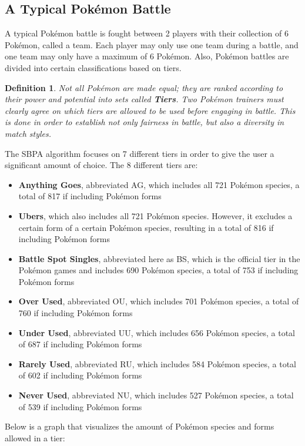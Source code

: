 \documentclass{article}
\newtheorem{definition}{Definition}
\begin{document}
\subsection{A Typical Pok\'emon Battle}
A typical Pok\'emon battle is fought between 2 players with their collection of 6 Pok\'emon, called a team. Each player may only use one team during a battle, and one team may only have a maximum of 6 Pok\'emon. Also, Pok\'emon battles are divided into certain classifications based on tiers.
\begin{definition}\label{tierdef}
	Not all Pok\'emon are made equal; they are ranked according to their power and potential into sets called \textbf{Tiers}. Two Pok\'emon trainers must clearly agree on which tiers are allowed to be used before engaging in battle. This is done in order to establish not only fairness in battle, but also a diversity in match styles.
\end{definition} 
The SBPA algorithm focuses on 7 different tiers in order to give the user a significant amount of choice. The 8 different tiers are:
\begin{itemize}
	\item \textbf{Anything Goes}, abbreviated AG, which includes all 721 Pok\'emon species, a total of 817 if including Pok\'emon forms
	\item \textbf{Ubers}, which also includes all 721 Pok\'emon species. However, it excludes a certain form of a certain Pok\'emon species, resulting in a total of 816 if including Pok\'emon forms
	\item \textbf{Battle Spot Singles}, abbreviated here as BS, which is the official tier in the Pok\'emon games and includes 690 Pok\'emon species, a total of 753 if including Pok\'emon forms
	\item \textbf{Over Used}, abbreviated OU, which includes 701 Pok\'emon species, a total of 760 if including Pok\'emon forms
	\item \textbf{Under Used}, abbreviated UU, which includes 656 Pok\'emon species, a total of 687 if including Pok\'emon forms
	\item \textbf{Rarely Used}, abbreviated RU, which includes 584 Pok\'emon species, a total of 602 if including Pok\'emon forms
	\item \textbf{Never Used}, abbreviated NU, which includes 527 Pok\'emon species, a total of 539 if including Pok\'emon forms
\end{itemize}
Below is a graph that visualizes the amount of Pok\'emon species and forms allowed in a tier:
\end{document}
